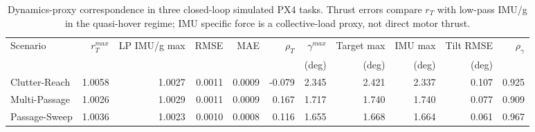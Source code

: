 \begin{table}[t]
\centering
\caption{Dynamics-proxy correspondence in three closed-loop simulated PX4 tasks. Thrust errors compare $r_T$ with low-pass IMU/g in the quasi-hover regime; IMU specific force is a collective-load proxy, not direct motor thrust.}
\label{tab:dynamics_proxy}
\scriptsize
\begin{tabular}{lrrrrrrrrrr}
\toprule
Scenario & $r_T^{max}$ & LP IMU/g max & RMSE & MAE & $\rho_T$ & $\gamma^{max}$ & Target max & IMU max & Tilt RMSE & $\rho_\gamma$ \\
 & & & & & & (deg) & (deg) & (deg) & (deg) & \\
\midrule
Clutter-Reach & 1.0058 & 1.0027 & 0.0011 & 0.0009 & -0.079 & 2.345 & 2.421 & 2.337 & 0.107 & 0.925 \\
Multi-Passage & 1.0026 & 1.0029 & 0.0011 & 0.0009 & 0.167 & 1.717 & 1.740 & 1.740 & 0.077 & 0.909 \\
Passage-Sweep & 1.0036 & 1.0023 & 0.0010 & 0.0008 & 0.116 & 1.655 & 1.668 & 1.664 & 0.061 & 0.967 \\
\bottomrule
\end{tabular}
\end{table}
